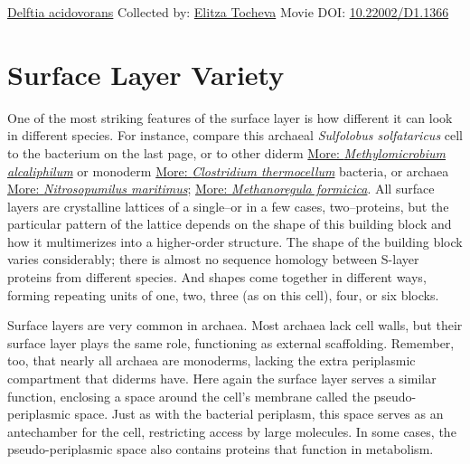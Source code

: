 \documentclass[]{tufte-book}
\begin{document}
\hypertarget{htmlwidget-92b2ff054edc468750ac}{}

\label{fig:2-6a}\protect\hyperlink{tree}{Delftia acidovorans} Collected by: \protect\hyperlink{elitza_tocheva}{Elitza Tocheva} Movie DOI: \href{https://doi.org/10.22002/D1.1366}{10.22002/D1.1366}

\hypertarget{surface-layer-variety}{%
\section{Surface Layer Variety}\label{surface-layer-variety}}

One of the most striking features of the surface layer is how different it can look in different species. For instance, compare this archaeal \emph{Sulfolobus solfataricus} cell to the bacterium on the last page, or to other diderm \protect\hyperlink{ux2aMethylomicrobium_alcaliphilumux2a}{More: \emph{Methylomicrobium alcaliphilum}} or monoderm \protect\hyperlink{ux2aClostridium_thermocellumux2a}{More: \emph{Clostridium thermocellum}} bacteria, or archaea \protect\hyperlink{ux2aNitrosopumilus_maritimusux2a}{More: \emph{Nitrosopumilus maritimus}}; \protect\hyperlink{ux2aMethanoregula_formicicaux2a}{More: \emph{Methanoregula formicica}}. All surface layers are crystalline lattices of a single--or in a few cases, two--proteins, but the particular pattern of the lattice depends on the shape of this building block and how it multimerizes into a higher-order structure. The shape of the building block varies considerably; there is almost no sequence homology between S-layer proteins from different species. And shapes come together in different ways, forming repeating units of one, two, three (as on this cell), four, or six blocks.

Surface layers are very common in archaea. Most archaea lack cell walls, but their surface layer plays the same role, functioning as external scaffolding. Remember, too, that nearly all archaea are monoderms, lacking the extra periplasmic compartment that diderms have. Here again the surface layer serves a similar function, enclosing a space around the cell's membrane called the pseudo-periplasmic space. Just as with the bacterial periplasm, this space serves as an antechamber for the cell, restricting access by large molecules. In some cases, the pseudo-periplasmic space also contains proteins that function in metabolism.



\hypertarget{htmlwidget-61882382cce5cb0986b6}{}
\end{document}
